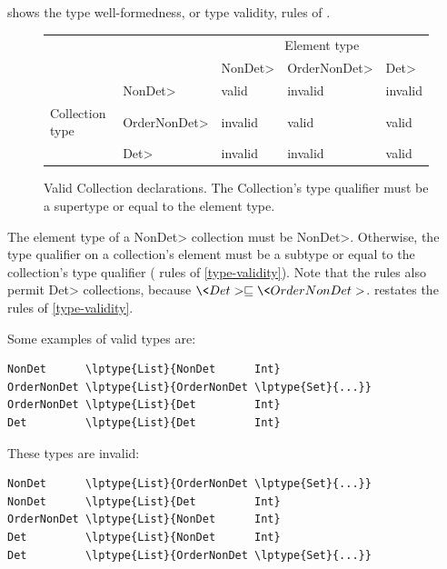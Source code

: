  shows the type well-formedness, or type validity,
rules of \ourTypeSystem. 

\begin{figure}
    \centering
    \begin{tabular}{|l|l|l|l|l|}
        \cline{3-5}
        \multicolumn{2}{c|}{~}  &  \multicolumn{3}{c|}{Element type} \\ \cline{3-5}
        \multicolumn{2}{c|}{~}  & \<NonDet>     & \<OrderNonDet> & \<Det> \\ \hline
                        & \<NonDet>      &  valid     &  invalid    & invalid  \\ \cline{2-5}
        Collection type & \<OrderNonDet> &  invalid   &  valid      & valid    \\ \cline{2-5}
                        & \<Det>         &  invalid   &  invalid    & valid    \\ \hline
    \end{tabular}
    \caption{Valid Collection declarations.  The Collection's type qualifier
        must be a supertype or equal to the element type.}
    \label{fig:determinism-collections}
\end{figure}

The element type of a \<NonDet> collection must be \<NonDet>.
Otherwise, the type qualifier on a collection's element must be a subtype or equal to
the collection's type qualifier ( rules of
\cref{type-validity}). Note that the  rules also
permit \<Det> collections,
because $\<Det> \sqsubseteq \<OrderNonDet>$.
 restates the  rules
of
\cref{type-validity}.

\smallskip
\noindent
\begin{minipage}{.48\textwidth}
Some examples of valid types are:
\begin{Verbatim}[commandchars=\\\{\}]
NonDet      \lptype{List}{NonDet      Int}
OrderNonDet \lptype{List}{OrderNonDet \lptype{Set}{...}}
OrderNonDet \lptype{List}{Det         Int}
Det         \lptype{List}{Det         Int}

\end{Verbatim}
\end{minipage}
\hfill
\begin{minipage}{.46\textwidth}
These types are invalid:
\begin{smaller}
\begin{Verbatim}[commandchars=\\\{\}]
NonDet      \lptype{List}{OrderNonDet \lptype{Set}{...}}
NonDet      \lptype{List}{Det         Int}
OrderNonDet \lptype{List}{NonDet      Int}
Det         \lptype{List}{NonDet      Int}
Det         \lptype{List}{OrderNonDet \lptype{Set}{...}}
\end{Verbatim}
\end{smaller}
\end{minipage}
\smallskip


